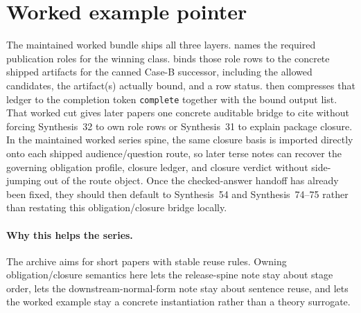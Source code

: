 \documentclass[11pt]{article}
\begin{document}
\section{Worked example pointer}
The maintained worked bundle ships all three layers.\cite{series:workedexample}
 names the required publication roles for the winning class.
 binds those role rows to the concrete shipped artifacts for the canned Case-B successor, including the allowed candidates, the artifact(s) actually bound, and a row status.
 then compresses that ledger to the completion token \texttt{complete} together with the bound output list.
That worked cut gives later papers one concrete auditable bridge to cite without forcing Synthesis~32 to own role rows or Synthesis~31 to explain package closure. In the maintained worked series spine, the same closure basis is imported directly onto each shipped audience/question route, so later terse notes can recover the governing obligation profile, closure ledger, and closure verdict without side-jumping out of the route object. Once the checked-answer handoff has already been fixed, they should then default to Synthesis~54 and Synthesis~74--75 rather than restating this obligation/closure bridge locally.\cite{series:challengeanswerreviewmenus,series:pairedterminalcitationdiscipline,series:pairedterminalcutoverrules}

\paragraph{Why this helps the series.}
The archive aims for short papers with stable reuse rules.
Owning obligation/closure semantics here lets the release-spine note stay about stage order, lets the downstream-normal-form note stay about sentence reuse, and lets the worked example stay a concrete instantiation rather than a theory surrogate.
\end{document}
